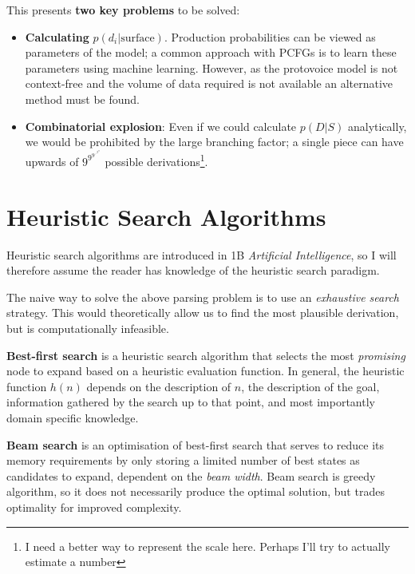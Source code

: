 \documentclass[12pt,a4paper,twoside,openright]{report}
\theoremstyle{definition}
\begin{document}
This presents \textbf{two key problems} to be solved:

\begin{itemize}
  \item \textbf{Calculating} $p(d_i|\text{surface})$. Production probabilities can be viewed as parameters of the model; a common approach with PCFGs is to learn these parameters using machine learning. However, as the protovoice model is not context-free and the volume of data required is not available an alternative method must be found.
  \item \textbf{Combinatorial explosion}: Even if we could calculate $p(D|S)$ analytically, we would be prohibited by the large branching factor; a single piece can have upwards of $9^{9^{9^{{\iddots}^{9^{9}}}}}$ possible derivations\footnote{I need a better way to represent the scale here. Perhaps I'll try to actually estimate a number}.
\end{itemize}

\section{Heuristic Search Algorithms}

Heuristic search algorithms are introduced in 1B \textit{Artificial Intelligence}, so I will therefore assume the reader has knowledge of the heuristic search paradigm.

The naive way to solve the above parsing problem is to use an \textit{exhaustive search} strategy. This would theoretically allow us to find the most plausible derivation, but is computationally infeasible.

\textbf{Best-first search} is a heuristic search algorithm that selects the most \textit{promising} node to expand based on a heuristic evaluation function. 
In general, the heuristic function $h(n)$ depends on  the description of $n$, the description of the goal, information gathered by the search up to that point, and most importantly domain specific knowledge\cite{pearlHeuristicsIntelligentSearch1984}.

\textbf{Beam search} is an optimisation of best-first search that serves to reduce its memory requirements by only storing a limited number of best states as candidates to expand, dependent on the \textit{beam width}. Beam search is greedy algorithm, so it does not necessarily produce the optimal solution, but trades optimality for improved complexity.

%
\end{document}
